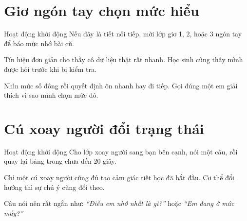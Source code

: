 \section{Giơ ngón tay chọn mức hiểu}
\begin{khoidongbox}{Hoạt động khởi động}
Nếu đây là tiết nối tiếp, mời lớp giơ 1, 2, hoặc 3 ngón tay để báo mức nhớ bài cũ.
\end{khoidongbox}
\begin{visaohieuqua}
Tín hiệu đơn giản cho thầy cô dữ liệu thật rất nhanh. Học sinh cũng thấy mình được hỏi trước khi bị kiểm tra.
\end{visaohieuqua}
\begin{cachlam5phut}
Nhìn mức số đông rồi quyết định ôn nhanh hay đi tiếp. Gọi đúng một em giải thích vì sao mình chọn mức đó.
\end{cachlam5phut}
\ngancach

\section{Cú xoay người đổi trạng thái}
\begin{khoidongbox}{Hoạt động khởi động}
Cho lớp xoay người sang bạn bên cạnh, nói một câu, rồi quay lại bảng trong chưa đến 20 giây.
\end{khoidongbox}
\begin{visaohieuqua}
Chỉ một cú xoay người cũng đủ tạo cảm giác tiết học đã bắt đầu. Cơ thể đổi hướng thì sự chú ý cũng đổi theo.
\end{visaohieuqua}
\begin{cachlam5phut}
Câu nói nên rất ngắn như: \textit{``Điều em nhớ nhất là gì?''} hoặc \textit{``Em đang ở mức mấy?''}
\end{cachlam5phut}